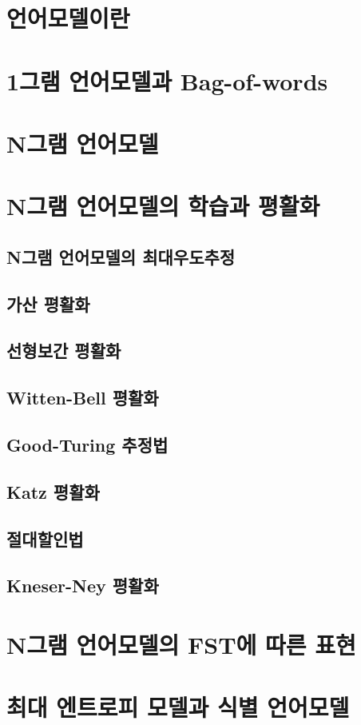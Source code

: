 \documentclass[../main.tex]{subfiles}
\begin{document}
\section{언어모델이란}
\section{1그램 언어모델과 Bag-of-words}
\section{N그램 언어모델}
\section{N그램 언어모델의 학습과 평활화}
\subsection{N그램 언어모델의 최대우도추정}
\subsection{가산 평활화}
\subsection{선형보간 평활화}
\subsection{Witten-Bell 평활화}
\subsection{Good-Turing 추정법}
\subsection{Katz 평활화}
\subsection{절대할인법}
\subsection{Kneser-Ney 평활화}

\section{N그램 언어모델의 FST에 따른 표현}\label{sec:N-gram-FST}
\section{최대 엔트로피 모델과 식별 언어모델}
\end{document}
